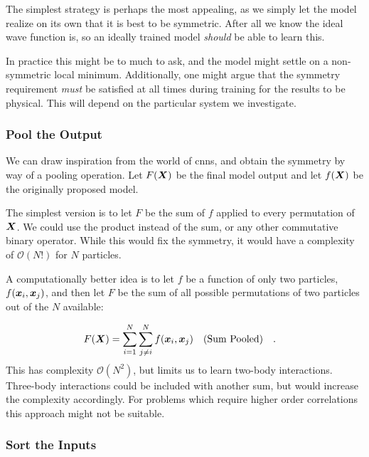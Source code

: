 \documentclass[Thesis.tex]{subfiles}
\begin{document}
The simplest strategy is perhaps the most appealing, as we simply let the model
realize on its own that  it is best to be symmetric. After all we know the ideal
wave function is, so an ideally trained model \emph{should} be able to learn
this.

In practice this might be to much to ask, and the model might settle on a
non-symmetric local minimum. Additionally, one might argue that the symmetry
requirement \emph{must} be satisfied at all times during training for the
results to be physical. This will depend on the particular system we investigate.


\subsubsection{Pool the Output}

We can draw inspiration from the world of \glspl{cnn}, and obtain the symmetry by
way of a pooling operation. Let $F(\bm{X})$ be the final model output and let
$f(\bm{X})$ be the originally proposed model.

The simplest version is to let $F$ be the sum of $f$ applied to every
permutation of $\bm{X}$. We could use the product instead of the sum, or any other
commutative binary operator. While this would fix the symmetry, it would have a
complexity of $\mathcal{O}(N!)$ for $N$ particles.

A computationally better idea is to let $f$ be a function of only two particles,
$f(\bm{x}_i, \bm{x}_j)$, and then let $F$ be the sum of all possible permutations of
two particles out of the $N$ available:

\begin{align}
  \label{eq:sum-pooling}
  F(\vX) &= \sum_{i=1}^N\sum_{j\neq i}^N f(\vx_i, \vx_j)\qq{(Sum Pooled)}.
\end{align}
This has complexity $\mathcal{O}(N^2)$, but limits us to learn
two-body interactions. Three-body interactions could be included with another
sum, but would increase the complexity accordingly. For problems which require higher
order correlations this approach might not be suitable.

\subsubsection{Sort the Inputs}
\label{sec:sorting-inputs-symmetry}
\end{document}
